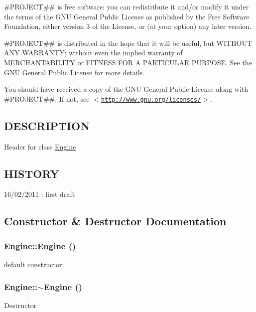 \#PROJECT\#\# is free software: you can redistribute it and/or modify it under the terms of the GNU General Public License as published by the Free Software Foundation, either version 3 of the License, or (at your option) any later version.

\#PROJECT\#\# is distributed in the hope that it will be useful, but WITHOUT ANY WARRANTY; without even the implied warranty of MERCHANTABILITY or FITNESS FOR A PARTICULAR PURPOSE. See the GNU General Public License for more details.

You should have received a copy of the GNU General Public License along with \#PROJECT\#\#. If not, see $<$\href{http://www.gnu.org/licenses/}{\tt http://www.gnu.org/licenses/}$>$.\hypertarget{d6/d40/classThread_3_01TM_01_4_DESCRIPTION}{}\subsection{DESCRIPTION}\label{d6/d40/classThread_3_01TM_01_4_DESCRIPTION}
Header for class \hyperlink{classEngine}{Engine}\hypertarget{d6/d40/classThread_3_01TM_01_4_HISTORY}{}\subsection{HISTORY}\label{d6/d40/classThread_3_01TM_01_4_HISTORY}
16/02/2011 : first draft 

\subsection{Constructor \& Destructor Documentation}
\hypertarget{classEngine_a8c98683b0a3aa28d8ab72a8bcd0d52f2}{
\subsubsection[{Engine}]{\setlength{\rightskip}{0pt plus 5cm}Engine::Engine ()}}
\label{d1/db6/classEngine_a8c98683b0a3aa28d8ab72a8bcd0d52f2}
default constructor \hypertarget{classEngine_a8ef7030a089ecb30bbfcb9e43094717a}{
\subsubsection[{$\sim$Engine}]{\setlength{\rightskip}{0pt plus 5cm}Engine::$\sim$Engine ()}}
\label{d1/db6/classEngine_a8ef7030a089ecb30bbfcb9e43094717a}
Destructor 

